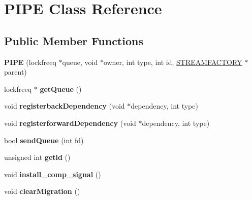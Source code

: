 \hypertarget{classPIPE}{}\section{P\+I\+P\+E Class Reference}
\label{classPIPE}
\subsection*{Public Member Functions}
\begin{DoxyCompactItemize}
\item 
\hypertarget{classPIPE_a8c01b0df984b8c440bbcbf65d18adfa0}{}{\bfseries P\+I\+P\+E} (lockfreeq $\ast$queue, void $\ast$owner, int type, int id, \hyperlink{classSTREAMFACTORY}{S\+T\+R\+E\+A\+M\+F\+A\+C\+T\+O\+R\+Y} $\ast$parent)\label{classPIPE_a8c01b0df984b8c440bbcbf65d18adfa0}

\item 
\hypertarget{classPIPE_aa75850c5323977b0addd8b82ded50c5c}{}lockfreeq $\ast$ {\bfseries get\+Queue} ()\label{classPIPE_aa75850c5323977b0addd8b82ded50c5c}

\item 
\hypertarget{classPIPE_afb6cf810e2f2bbf4b6d6dde612fa7e4a}{}void {\bfseries registerback\+Dependency} (void $\ast$dependency, int type)\label{classPIPE_afb6cf810e2f2bbf4b6d6dde612fa7e4a}

\item 
\hypertarget{classPIPE_aa824d974401a7eb2234fb68c347ef085}{}void {\bfseries registerforward\+Dependency} (void $\ast$dependency, int type)\label{classPIPE_aa824d974401a7eb2234fb68c347ef085}

\item 
\hypertarget{classPIPE_acdd22218d8c907b07e90c99d52fc8bad}{}bool {\bfseries send\+Queue} (int fd)\label{classPIPE_acdd22218d8c907b07e90c99d52fc8bad}

\item 
\hypertarget{classPIPE_ab60c7b12bb095d63948f61b38169d9ce}{}unsigned int {\bfseries getid} ()\label{classPIPE_ab60c7b12bb095d63948f61b38169d9ce}

\item 
\hypertarget{classPIPE_a3d569671bae10ff29646feed8b495451}{}void {\bfseries install\+\_\+comp\+\_\+signal} ()\label{classPIPE_a3d569671bae10ff29646feed8b495451}

\item 
\hypertarget{classPIPE_a6608edddd645df5a90bcd22ce1391c30}{}void {\bfseries clear\+Migration} ()\label{classPIPE_a6608edddd645df5a90bcd22ce1391c30}


\end{DoxyCompactItemize}
